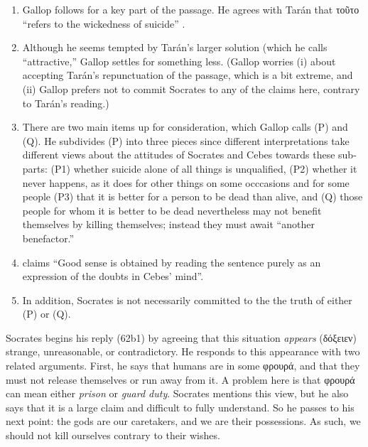 \documentclass[12pt,letterpaper]{article}
\begin{document}
\begin{enumerate}
    \item Gallop follows \textcite{taran1966} for a key part of the passage. He agrees with Tarán that \textgreek{τοῦτο} ``refers to the wickedness of suicide'' \parencite*[335]{taran1966}.
    \item Although he seems tempted by Tarán's larger solution (which he calls ``attractive,'' Gallop settles for something less. (Gallop worries (i) about accepting Tarán's repunctuation of the passage, which is a bit extreme, and (ii) Gallop prefers not to commit Socrates to any of the claims here, contrary to Tarán's reading.)
    \item There are two main items up for consideration, which Gallop calls (P) and (Q). He subdivides (P) into three pieces since different interpretations take different views about the attitudes of Socrates and Cebes towards these sub-parts: (P1) whether suicide alone of all things is unqualified, (P2) whether it never happens, as it does for other things on some occcasions and for some people (P3) that it is better for a person to be dead than alive, and (Q) those people for whom it is better to be dead nevertheless may not benefit themselves by killing themselves; instead they must await ``another benefactor.''
    \item \textcite[82]{gallop1975} claims ``Good sense is obtained by reading the sentence purely as an expression of the doubts in Cebes' mind''.
    \item In addition, Socrates is not necessarily committed to the the truth of either (P) or (Q).
\end{enumerate}


Socrates begins his reply (62b1) by agreeing that this situation \textit{appears} (\textgreek{δόξειεν}) strange, unreasonable, or contradictory. He responds to this appearance with two related arguments. First, he says that humans are in some \textgreek{φρουρά}, and that they must not release themselves or run away from it. A problem here is that \textgreek{φρουρά} can mean either \textit{prison} or \textit{guard duty}. Socrates mentions this view, but he also says that it is a large claim and difficult to fully understand. So he passes to his next point: the gods are our caretakers, and we are their possessions. As such, we should not kill ourselves contrary to their wishes.


\newpage
\printbibliography
\end{document}

